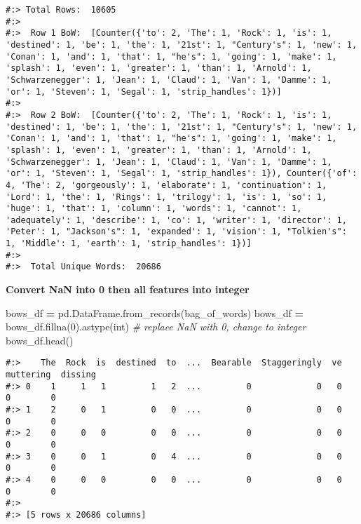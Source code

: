 \documentclass[
]{book}
\newenvironment{Shaded}{\begin{snugshade}}{\end{snugshade}}
\newcommand{\BuiltInTok}[1]{#1}
\newcommand{\CommentTok}[1]{\textcolor[rgb]{0.37,0.37,0.37}{\textit{#1}}}
\newcommand{\DecValTok}[1]{\textcolor[rgb]{0.06,0.06,0.06}{#1}}
\newcommand{\NormalTok}[1]{#1}
\newcommand{\OperatorTok}[1]{\textcolor[rgb]{0.43,0.43,0.43}{\textbf{#1}}}
\begin{document}
\begin{verbatim}
#:> Total Rows:  10605 
#:> 
#:>  Row 1 BoW:  [Counter({'to': 2, 'The': 1, 'Rock': 1, 'is': 1, 'destined': 1, 'be': 1, 'the': 1, '21st': 1, "Century's": 1, 'new': 1, 'Conan': 1, 'and': 1, 'that': 1, "he's": 1, 'going': 1, 'make': 1, 'splash': 1, 'even': 1, 'greater': 1, 'than': 1, 'Arnold': 1, 'Schwarzenegger': 1, 'Jean': 1, 'Claud': 1, 'Van': 1, 'Damme': 1, 'or': 1, 'Steven': 1, 'Segal': 1, 'strip_handles': 1})] 
#:> 
#:>  Row 2 BoW:  [Counter({'to': 2, 'The': 1, 'Rock': 1, 'is': 1, 'destined': 1, 'be': 1, 'the': 1, '21st': 1, "Century's": 1, 'new': 1, 'Conan': 1, 'and': 1, 'that': 1, "he's": 1, 'going': 1, 'make': 1, 'splash': 1, 'even': 1, 'greater': 1, 'than': 1, 'Arnold': 1, 'Schwarzenegger': 1, 'Jean': 1, 'Claud': 1, 'Van': 1, 'Damme': 1, 'or': 1, 'Steven': 1, 'Segal': 1, 'strip_handles': 1}), Counter({'of': 4, 'The': 2, 'gorgeously': 1, 'elaborate': 1, 'continuation': 1, 'Lord': 1, 'the': 1, 'Rings': 1, 'trilogy': 1, 'is': 1, 'so': 1, 'huge': 1, 'that': 1, 'column': 1, 'words': 1, 'cannot': 1, 'adequately': 1, 'describe': 1, 'co': 1, 'writer': 1, 'director': 1, 'Peter': 1, "Jackson's": 1, 'expanded': 1, 'vision': 1, "Tolkien's": 1, 'Middle': 1, 'earth': 1, 'strip_handles': 1})] 
#:> 
#:>  Total Unique Words:  20686
\end{verbatim}

\textbf{Convert NaN into 0 then all features into integer}

\begin{Shaded}
\begin{Highlighting}[]
\NormalTok{bows\_df }\OperatorTok{=}\NormalTok{ pd.DataFrame.from\_records(bag\_of\_words)}
\NormalTok{bows\_df }\OperatorTok{=}\NormalTok{ bows\_df.fillna(}\DecValTok{0}\NormalTok{).astype(}\BuiltInTok{int}\NormalTok{)  }\CommentTok{\# replace NaN with 0, change to integer}
\NormalTok{bows\_df.head()}
\end{Highlighting}
\end{Shaded}

\begin{verbatim}
#:>    The  Rock  is  destined  to  ...  Bearable  Staggeringly  ve  muttering  dissing
#:> 0    1     1   1         1   2  ...         0             0   0          0        0
#:> 1    2     0   1         0   0  ...         0             0   0          0        0
#:> 2    0     0   0         0   0  ...         0             0   0          0        0
#:> 3    0     0   1         0   4  ...         0             0   0          0        0
#:> 4    0     0   0         0   0  ...         0             0   0          0        0
#:> 
#:> [5 rows x 20686 columns]
\end{verbatim}
\end{document}
